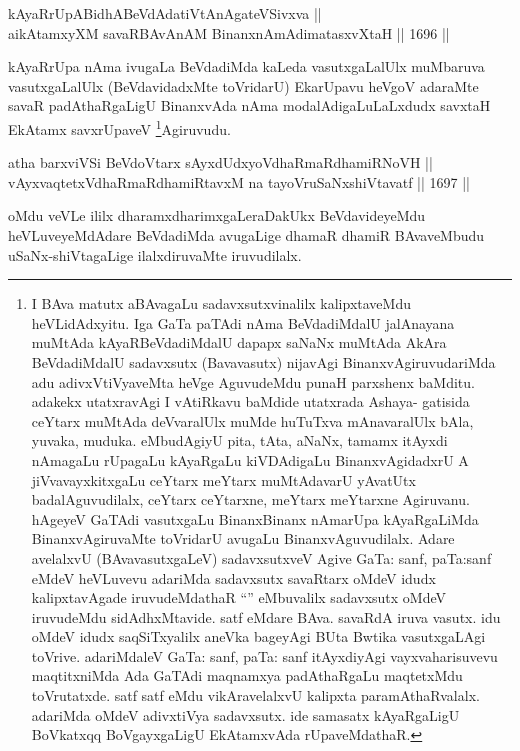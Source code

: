 \begin{shl}
kAyaRrUpABidhABeVdAdatiVtAnAgateVSivxva || \\
aikAtamxyXM savaRBAvAnAM BinanxnAmAdimatasxvXtaH ||  1696 ||  
\end{shl}

\begin{artha}
kAyaRrUpa nAma ivugaLa BeVdadiMda kaLeda vasutxgaLalUlx muMbaruva vasutxgaLalUlx (BeVdavidadxMte toVridarU) EkarUpavu heVgoV adaraMte savaR padAthaRgaLigU BinanxvAda nAma modalAdigaLuLaLxdudx savxtaH EkAtamx savxrUpaveV \footnote{I BAva matutx aBAvagaLu sadavxsutxvinalilx kalipxtaveMdu heVLidAdxyitu. Iga GaTa paTAdi nAma BeVdadiMdalU jalAnayana muMtAda kAyaRBeVdadiMdalU dapapx saNaNx muMtAda AkAra BeVdadiMdalU sadavxsutx (Bavavasutx) nijavAgi BinanxvAgiruvudariMda adu adivxVtiVyaveMta heVge AguvudeMdu punaH parxshenx baMditu. adakekx utatxravAgi I vAtiRkavu baMdide utatxrada Ashaya- gatisida ceYtarx muMtAda deVvaralUlx muMde huTuTxva mAnavaralUlx bAla, yuvaka, muduka. eMbudAgiyU pita, tAta, aNaNx, tamamx itAyxdi nAmagaLu rUpagaLu kAyaRgaLu kiVDAdigaLu BinanxvAgidadxrU A jiVvavayxkitxgaLu ceYtarx meYtarx muMtAdavarU yAvatUtx badalAguvudilalx, ceYtarx ceYtarxne, meYtarx meYtarxne Agiruvanu. hAgeyeV GaTAdi vasutxgaLu BinanxBinanx nAmarUpa kAyaRgaLiMda BinanxvAgiruvaMte toVridarU avugaLu BinanxvAguvudilalx. Adare avelalxvU (BAvavasutxgaLeV) sadavxsutxveV Agive GaTa: sanf, paTa:sanf eMdeV heVLuvevu adariMda sadavxsutx savaRtarx oMdeV idudx kalipxtavAgade iruvudeMdathaR ``\stext'' eMbuvalilx sadavxsutx oMdeV iruvudeMdu sidAdhxMtavide. satf eMdare BAva. savaRdA iruva vasutx. idu oMdeV idudx saqSiTxyalilx aneVka bageyAgi BUta Bwtika vasutxgaLAgi toVrive. adariMdaleV GaTa: sanf, paTa: sanf itAyxdiyAgi vayxvaharisuvevu maqtitxniMda Ada GaTAdi maqnamxya padAthaRgaLu maqtetxMdu toVrutatxde. satf satf eMdu vikAravelalxvU kalipxta paramAthaRvalalx. adariMda oMdeV adivxtiVya sadavxsutx. ide samasatx kAyaRgaLigU BoVkatxqq BoVgayxgaLigU EkAtamxvAda rUpaveMdathaR.}Agiruvudu.
\end{artha}

\begin{shl}
atha barxviVSi BeVdoV\s tarx sAyxdUdxyoVdhaRmaRdhamiRNoVH || \\
vAyxvaqtetxVdhaRmaRdhamiRtavxM na tayoVruSaNxshiVtavatf ||  1697 ||  
\end{shl}

\begin{artha}
oMdu veVLe ililx dharamxdharimxgaLeraDakUkx BeVdavideyeMdu heVLuveyeMdAdare BeVdadiMda avugaLige dhamaR dhamiR BAvaveMbudu uSaNx-shiVtagaLige ilalxdiruvaMte iruvudilalx.
\end{artha}

